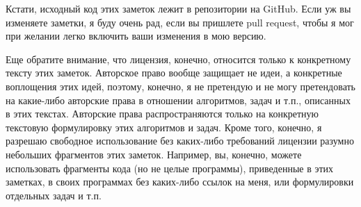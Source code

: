 Кстати, исходный код этих заметок лежит в репозитории на GitHub. Если уж вы изменяете заметки, я буду очень рад, если вы пришлете pull request, чтобы я мог при желании легко включить ваши изменения в мою версию.

Еще обратите внимание, что лицензия, конечно, относится только к конкретному тексту этих заметок. Авторское право вообще защищает не идеи, а конкретные воплощения этих идей, поэтому, конечно, я не претендую и не могу претендовать на какие-либо авторские права в отношении алгоритмов, задач и т.п., описанных в этих текстах. Авторские права распространяются только на конкретную текстовую формулировку этих алгоритмов и задач.
Кроме того, конечно, я разрешаю свободное использование без каких-либо требований лицензии разумно небольших фрагментов этих заметок. Например, вы, конечно, можете использовать фрагменты кода (но не целые программы), приведенные в этих заметках, в своих программах без каких-либо ссылок на меня, или формулировки отдельных задач и т.п.